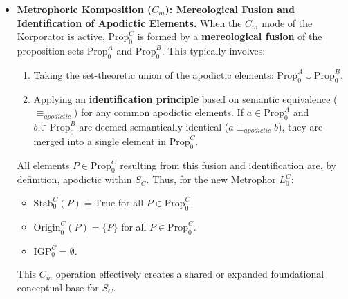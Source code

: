\documentclass[
    12pt,              %
    a4paper,           %
    headings=normal,   %
    twoside=true,      %
    BCOR=8mm,          %
]{scrbook}
\begin{document}
\begin{itemize}
    \item   \textbf{Metrophoric Komposition (\(C_m\)): Mereological Fusion and Identification of Apodictic Elements.}
        When the \(C_m\) mode of the Korporator is active, \(\text{Prop}_0^C\) is formed by a \textbf{mereological fusion} of the proposition sets \(\text{Prop}_0^A\) and \(\text{Prop}_0^B\). This typically involves:
        \begin{enumerate}[label=(\roman*)]
            \item  Taking the set-theoretic union of the apodictic elements: \(\text{Prop}_0^A \cup \text{Prop}_0^B\).
            \item  Applying an \textbf{identification principle} based on semantic equivalence (\(\equiv_{apodictic}\)) for any common apodictic elements. If \(a \in \text{Prop}_0^A\) and \(b \in \text{Prop}_0^B\) are deemed semantically identical (\(a \equiv_{apodictic} b\)), they are merged into a single element in \(\text{Prop}_0^C\).
        \end{enumerate}
        All elements \(P \in \text{Prop}_0^C\) resulting from this fusion and identification are, by definition, apodictic within \(S_C\). Thus, for the new Metrophor \(L_0^C\):
        \begin{itemize}
            \item   \(\text{Stab}_0^C(P) = \text{True}\) for all \(P \in \text{Prop}_0^C\).
            \item   \(\text{Origin}_0^C(P) = \{P\}\) for all \(P \in \text{Prop}_0^C\).
            \item   \(\text{IGP}_0^C = \emptyset\).
        \end{itemize}
        This \(C_m\) operation effectively creates a shared or expanded foundational conceptual base for \(S_C\).


\end{itemize}
\end{document}
